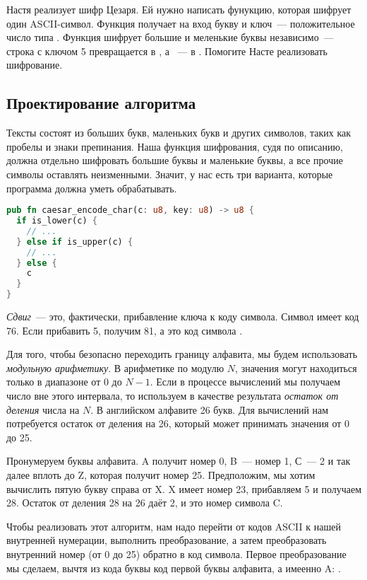 \begin{Exercise}
  \Question
  Настя реализует шифр Цезаря. Ей нужно написать фунукцию, которая шифрует один ASCII-символ.
  Функция получает на вход букву и ключ~--- положительное число типа .
  Функция шифрует большие и меленькие буквы независимо~--- строка  с ключом 5 превращается в , а ~--- в .
  Помогите Насте реализовать шифрование.
\end{Exercise}

\subsection{Проектирование алгоритма}

Тексты состоят из больших букв, маленьких букв и других символов, таких как пробелы и знаки препинания.
Наша функция шифрования, судя по описанию, должна отдельно шифровать большие буквы и маленькие буквы, а все прочие символы оставлять неизменными.
Значит, у нас есть три варианта, которые программа должна уметь обрабатывать.

\begin{lstlisting}[language=Rust]
pub fn caesar_encode_char(c: u8, key: u8) -> u8 {
  if is_lower(c) {
    // ...
  } else if is_upper(c) {
    // ...
  } else {
    c
  }
}
\end{lstlisting}

{\em Сдвиг}~--- это, фактически, прибавление ключа к коду символа. Символ  имеет код 76.
Если прибавить 5, получим 81, а это код символа .

Для того, чтобы безопасно переходить границу алфавита, мы будем использовать {\em модульную арифметику}.
В арифметике по модулю $N$, значения могут находиться только в диапазоне от $0$ до $N - 1$.
Если в процессе вычислений мы получаем число вне этого интервала, то используем в качестве результата {\em остаток от деления} числа на $N$.
В английском алфавите 26 букв. Для вычислений нам потребуется остаток от деления на 26, который может принимать значения от 0 до 25.

Пронумеруем буквы алфавита. A получит номер 0, B~--- номер 1, С~--- 2 и так далее вплоть до Z, которая получит номер 25.
Предположим, мы хотим вычислить пятую букву справа от X. X имеет номер 23, прибавляем 5 и получаем 28.
Остаток от деления 28 на 26 даёт 2, и это номер символа C.

Чтобы реализовать этот алгоритм, нам надо перейти от кодов ASCII к нашей внутренней нумерации, выполнить преобразование, а затем преобразовать внутренний номер (от 0 до 25) обратно в код символа.
Первое преобразование мы сделаем, вычтя из кода буквы код первой буквы алфавита, а имеенно A: .

